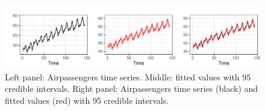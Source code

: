 \documentclass[
  12pt,
]{book}
\theoremstyle{break}
\theoremstyle{nonumberplain}
\begin{document}
\begin{figure}[H]

{\centering \includegraphics{Dynamic-Shrinkage-in-Bayesian-Structural-Time-Series-and-Vector-Autoregressive-Models_files/figure-latex/unnamed-chunk-13-1} 

}

\caption{Left panel: Airpassengers time series. Middle: fitted values with 95 credible intervals. Right panel: Airpassengers time series (black) and fitted values (red) with 95 credible intervals.}\label{fig:unnamed-chunk-13}
\end{figure}

\backmatter
\end{document}
